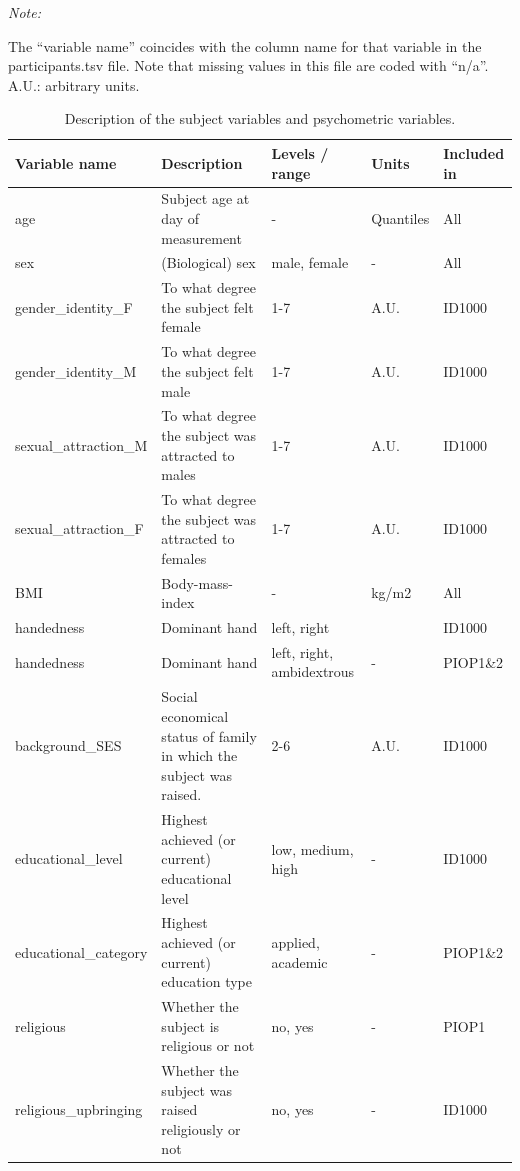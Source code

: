 \documentclass[12pt,american,a4paper,oneside,]{memoir} %
\begin{document}
\begingroup\fontsize{8}{10}\selectfont

\begin{ThreePartTable}
\begin{TableNotes}[para]
\item \textit{Note: } 
\item The “variable name” coincides with the column name for that variable in the participants.tsv file. Note that missing values in this file are coded with “n/a”. A.U.: arbitrary units.
\end{TableNotes}
\begin{longtabu} to 
\caption{\label{tab:tab-aomic-S5}Description of the subject variables and psychometric variables.}\\
\toprule
Variable name & Description & Levels / range & Units & Included in\\
\midrule
age & Subject age at day of measurement & - & Quantiles & All\\
sex & (Biological) sex & male, female & - & All\\
gender\_identity\_F & To what degree the subject felt female & 1-7 & A.U. & ID1000\\
gender\_identity\_M & To what degree the subject felt male & 1-7 & A.U. & ID1000\\
sexual\_attraction\_M & To what degree the subject was attracted to males & 1-7 & A.U. & ID1000\\
\addlinespace
sexual\_attraction\_F & To what degree the subject was attracted to females & 1-7 & A.U. & ID1000\\
BMI & Body-mass-index & - & kg/m2 & All\\
handedness & Dominant hand & left, right &  & ID1000\\
handedness & Dominant hand & left, right, ambidextrous & - & PIOP1\&2\\
background\_SES & Social economical status of family in which the subject was raised. & 2-6 & A.U. & ID1000\\
\addlinespace
educational\_level & Highest achieved (or current) educational level & low, medium, high & - & ID1000\\
educational\_category & Highest achieved (or current) education type & applied, academic & - & PIOP1\&2\\
religious & Whether the subject is religious or not & no, yes & - & PIOP1\\
religious\_upbringing & Whether the subject was raised religiously or not & no, yes & - & ID1000\\

\end{longtabu}
\end{ThreePartTable}
\end{document}
